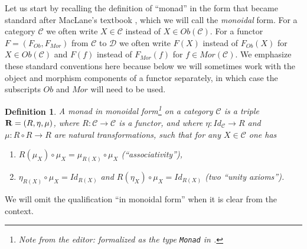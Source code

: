\documentclass[onecolumn,12pt]{amsart}
\newtheorem{definition}[proposition]{Definition}
\numberwithin{proposition}{subsection}
\newcommand{\sr}{\rightarrow}
\newcommand{\R}{{\bf R}}
\newcommand{\C}{{\mathcal C}}
\newcommand{\D}{{\mathcal D}}
\newcommand{\editorfootnote}[1]{\footnote{Note from the editor: #1}}
\begin{document}
Let us start by recalling the definition of ``monad'' in the form that became
standard after MacLane's textbook \cite[p.~133]{MacLane}, which we will call
the {\em monoidal} form. For a category $\C$ we often write $X\in\C$ instead of
$X\in Ob(\C)$. For a functor $F=(F_{Ob},F_{Mor})$ from $\C$ to $\D$ we often
write $F(X)$ instead of $F_{Ob}(X)$ for $X\in Ob(\C)$ and $F(f)$ instead of
$F_{Mor}(f)$ for $f\in Mor(\C)$.  We emphasize these standard conventions here
because below we will sometimes work with the object and morphism components of
a functor separately, in which case the subscripts $Ob$ and $Mor$ will need to
be used.
%
\begin{definition}
  \label{2017.04.01.def1}
  A {\em monad in monoidal form}\editorfootnote{formalized as the type {\tt Monad} in \cite{UniMath}.}
  on a category $\C$ is a triple $\R=(R,\eta,\mu)$,
  where $R:\C\sr \C$ is a functor, and where $\eta:Id_{\C}\sr R$ and $\mu:R\circ R\sr R$
  are natural transformations, such that for any $X\in\C$ one has
  \begin{enumerate}
  \item \label{2017.04.19.eq7} $R(\mu_X)\circ \mu_{X}=\mu_{R(X)}\circ \mu_X$ (``associativity''),
  \item \label{2017.04.19.eq8} $\eta_{R(X)}\circ \mu_X=Id_{R(X)}$ and $R(\eta_X)\circ \mu_X=Id_{R(X)}$ (two ``unity axioms'').
  \end{enumerate}
\end{definition}
%
We will omit the qualification ``in monoidal form'' when it is clear from the context. 
\end{document}
